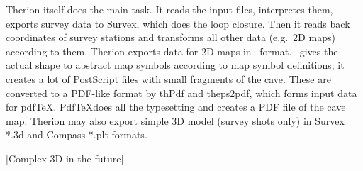 Therion itself does the main task. It reads the input files, interpretes them, 
exports survey data to Survex, which does the loop closure. Then it reads back 
coordinates of survey stations and transforms all other data (e.g.~2D maps) 
according to them. Therion exports data for 2D maps in \MP\ format. \MP\ gives 
the actual shape to abstract map symbols according to map symbol definitions; it
creates a lot of PostScript files with small fragments of the cave. These are 
converted to a PDF-like format by thPdf and theps2pdf, which forms input data 
for pdf\TeX. Pdf\TeX does all the typesetting and creates a PDF file of the cave 
map. Therion may also export simple 3D model (survey shots only) in Survex *.3d 
and Compass *.plt formats. 

[Complex 3D in the future]





\endinput
